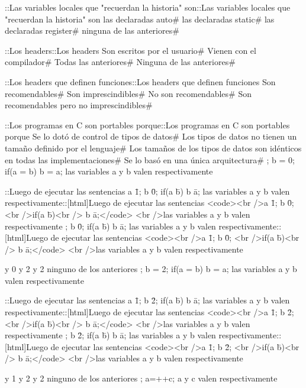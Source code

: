 {{{{{{{{{\question ::Las variables locales que "recuerdan la historia" son::Las variables locales que "recuerdan la historia" son
\choice las declaradas auto# 
\correctchoice las declaradas static# 
\choice las declaradas register# 
\choice ninguna de las anteriores# 

\question ::Los headers::Los headers
\choice Son escritos por el usuario# 
\choice Vienen con el compilador# 
\correctchoice Todas las anteriores# 
\choice Ninguna de las anteriores# 

\question ::Los headers que definen funciones::Los headers que definen funciones
\choice Son recomendables# 
\choice Son imprescindibles# 
\correctchoice No son recomendables# 
\choice Son recomendables pero no imprescindibles# 

\question ::Los programas en C son portables porque::Los programas en C son portables porque
\choice Se lo dotó de control de tipos de datos# 
\correctchoice Los tipos de datos no tienen un tamaño definido por el lenguaje# 
\choice Los tamaños de los tipos de datos son idénticos en todas las implementaciones# 
\choice Se lo basó en una única arquitectura# 
; b = 0; if(a = b)   b = a; las variables a y b valen respectivamente 

\question ::Luego de ejecutar las sentencias a \= 1; b \= 0; if(a \= b)   b \= a; las variables a y b valen respectivamente::[html]Luego de ejecutar las sentencias <code><br />a \= 1; b \= 0; <br />if(a \= b)<br /> b \= a;</code> <br />las variables a y b valen respectivamente
; b \= 0; if(a \= b)   b \= a; las variables a y b valen respectivamente::[html]Luego de ejecutar las sentencias <code><br />a \= 1; b \= 0; <br />if(a \= b)<br /> b \= a;</code> <br />las variables a y b valen respectivamente{
 y 0
 y 2
 y 2
\choice ninguno de los anteriores
; b = 2; if(a = b)   b = a; las variables a y b valen respectivamente 

\question ::Luego de ejecutar las sentencias a \= 1; b \= 2; if(a \= b)   b \= a; las variables a y b valen respectivamente::[html]Luego de ejecutar las sentencias <code><br />a \= 1; b \= 2; <br />if(a \= b)<br /> b \= a;</code> <br />las variables a y b valen respectivamente
; b \= 2; if(a \= b)   b \= a; las variables a y b valen respectivamente::[html]Luego de ejecutar las sentencias <code><br />a \= 1; b \= 2; <br />if(a \= b)<br /> b \= a;</code> <br />las variables a y b valen respectivamente{
 y 1
 y 2
 y 2
\choice ninguno de los anteriores
; a=++c; a y c valen respectivamente 

}}}}}}}}}}}
